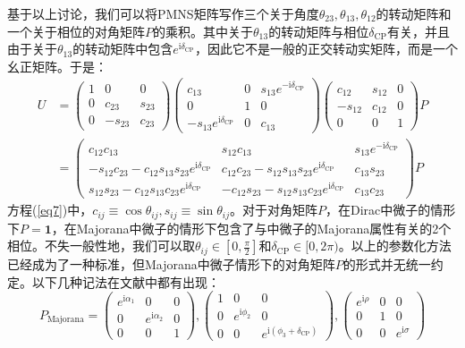 \documentclass{article}
\newcommand{\ii}{\mathrm{i}}
\begin{document}
	基于以上讨论，我们可以将PMNS矩阵写作三个关于角度$\theta_{23},\theta_{13},\theta_{12}$的转动矩阵和一个关于相位的对角矩阵$P$的乘积。其中关于$\theta_{13}$的转动矩阵与相位$\delta_\mathrm{CP}$有关，并且由于关于$\theta_{13}$的转动矩阵中包含$e^{\ii\delta_\mathrm{CP}}$，因此它不是一般的正交转动实矩阵，而是一个幺正矩阵。于是：
	\begin{equation}
		\begin{aligned}
			U&=\begin{pmatrix}1&0&0\\0&c_{23}&s_{23}\\0&-s_{23}&c_{23}\end{pmatrix}\begin{pmatrix}c_{13}&0&s_{13}e^{-\ii\delta_{\mathrm{CP}}}\\0&1&0\\-s_{13}e^{\ii\delta_{\mathrm{CP}}}&0&c_{13}\end{pmatrix}\begin{pmatrix}c_{12}&s_{12}&0\\-s_{12}&c_{12}&0\\0&0&1\end{pmatrix}P\\
			&=\begin{pmatrix}c_{12}c_{13}&s_{12}c_{13}&s_{13}e^{-\ii\delta_{\mathrm{CP}}}\\-s_{12}c_{23}-c_{12}s_{13}s_{23}e^{\ii\delta_{\mathrm{CP}}}&c_{12}c_{23}-s_{12}s_{13}s_{23}e^{\ii\delta_{\mathrm{CP}}}&c_{13}s_{23}\\s_{12}s_{23}-c_{12}s_{13}c_{23}e^{\ii\delta_{\mathrm{CP}}}&-c_{12}s_{23}-s_{12}s_{13}c_{23}e^{\ii\delta_{\mathrm{CP}}}&c_{13}c_{23}\end{pmatrix}P
		\end{aligned}
		\label{eq7}
	\end{equation}
	方程(\ref{eq7})中，$c_{ij}\equiv\cos\theta_{ij},s_{ij}\equiv\sin\theta_{ij}$。对于对角矩阵$P$，在Dirac中微子的情形下$P=\mathbf{1}$，在Majorana中微子的情形下包含了与中微子的Majorana属性有关的2个相位。不失一般性地，我们可以取$\theta_{ij}\in[0,\frac{\pi}{2}]$和$\delta_\mathrm{CP}\in[0,2\pi)$。以上的参数化方法已经成为了一种标准，但Majorana中微子情形下的对角矩阵$P$的形式并无统一约定。以下几种记法在文献中都有出现：
	\begin{equation}
		P_\mathrm{Majorana}=\begin{pmatrix}e^{\ii\alpha_1}&0&0\\0&e^{\ii\alpha_2}&0\\0&0&1\end{pmatrix},\begin{pmatrix}1&0&0\\0&e^{\ii\phi_2}&0\\0&0&e^{\ii(\phi_3+\delta_{\mathrm{CP}})}\end{pmatrix},\begin{pmatrix}e^{\ii\rho}&0&0\\0&1&0\\0&0&e^{\ii\sigma}\end{pmatrix}
	\end{equation}
\end{document}
